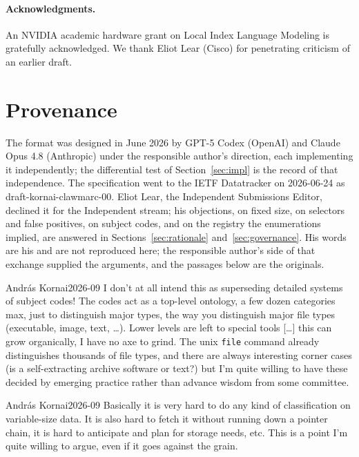 \documentclass[11pt]{article}
\begin{document}
\paragraph{Acknowledgments.} An NVIDIA academic hardware grant on Local Index
Language Modeling is gratefully acknowledged. We thank Eliot Lear (Cisco) for
penetrating criticism of an earlier draft.

\section{Provenance}
\label{sec:provenance}

The format was designed in June 2026 by GPT-5 Codex (OpenAI) and Claude Opus
4.8 (Anthropic) under the responsible author's direction, each implementing
it independently; the differential test of Section~\ref{sec:impl} is the
record of that independence. The specification went to the IETF Datatracker
on 2026-06-24 as draft-kornai-clawmarc-00. Eliot Lear, the Independent
Submissions Editor, declined it for the Independent stream; his objections,
on fixed size, on selectors and false positives, on subject codes, and on the
registry the enumerations implied, are answered in Sections~\ref{sec:rationale}
and~\ref{sec:governance}. His words are his and are not reproduced here; the
responsible author's side of that exchange supplied the arguments, and the
passages below are the originals.

\begin{seniorquote}{Andr\'as Kornai}{2026-09}
I don't at all intend this as superseding detailed systems of subject codes!
The codes act as a top-level ontology, a few dozen categories max, just to
distinguish major types, the way you distinguish major file types
(executable, image, text, \dots). Lower levels are left to special tools
[\dots] this can grow organically, I have no axe to grind. The unix
\texttt{file} command already distinguishes thousands of file types, and
there are always interesting corner cases (is a self-extracting archive
software or text?) but I'm quite willing to have these decided by emerging
practice rather than advance wisdom from some committee.
\end{seniorquote}

\begin{seniorquote}{Andr\'as Kornai}{2026-09}
Basically it is very hard to do any kind of classification on variable-size
data. It is also hard to fetch it without running down a pointer chain, it is
hard to anticipate and plan for storage needs, etc. This is a point I'm quite
willing to argue, even if it goes against the grain.
\end{seniorquote}
\end{document}
